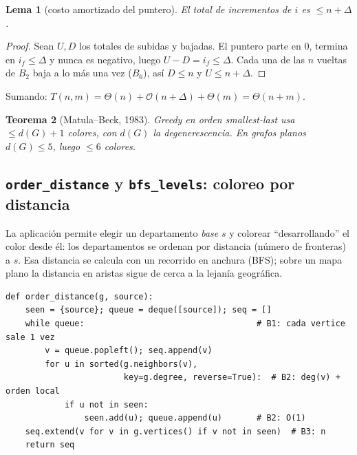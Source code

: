 \documentclass[11pt,a4paper]{article}
\newtheorem{teorema}{Teorema}[section]
\newtheorem{lema}[teorema]{Lema}
\theoremstyle{definition}
\theoremstyle{remark}
\newcommand{\bigO}{\mathcal{O}}
\begin{document}
\begin{lema}[costo amortizado del puntero]\label{lema:puntero}
El total de incrementos de $i$ es $\le n+\Delta$.
\end{lema}
\begin{proof}
Sean $U,D$ los totales de subidas y bajadas. El puntero parte en $0$, termina en
$i_f\le\Delta$ y nunca es negativo, luego $U-D=i_f\le\Delta$. Cada una de las $n$
vueltas de $B_2$ baja a lo más una vez ($B_6$), así $D\le n$ y $U\le n+\Delta$.
\end{proof}
Sumando: $T(n,m)=\Theta(n)+\bigO(n+\Delta)+\Theta(m)=\Theta(n+m)$.
\begin{teorema}[Matula--Beck, 1983]
Greedy en orden smallest-last usa $\le d(G)+1$ colores, con $d(G)$ la
degenerescencia. En grafos planos $d(G)\le 5$, luego $\le 6$ colores.
\end{teorema}

\subsection{\texttt{order\_distance} y \texttt{bfs\_levels}: coloreo por distancia}
\label{sec:dist}

La aplicación permite elegir un departamento \emph{base} $s$ y colorear
``desarrollando'' el color desde él: los departamentos se ordenan por distancia
(número de fronteras) a $s$. Esa distancia se calcula con un recorrido en anchura
(BFS); sobre un mapa plano la distancia en aristas sigue de cerca a la lejanía
geográfica.

\begin{lstlisting}
def order_distance(g, source):
    seen = {source}; queue = deque([source]); seq = []
    while queue:                                   # B1: cada vertice sale 1 vez
        v = queue.popleft(); seq.append(v)
        for u in sorted(g.neighbors(v),
                        key=g.degree, reverse=True):  # B2: deg(v) + orden local
            if u not in seen:
                seen.add(u); queue.append(u)       # B2: O(1)
    seq.extend(v for v in g.vertices() if v not in seen)  # B3: n
    return seq
\end{lstlisting}
\end{document}
